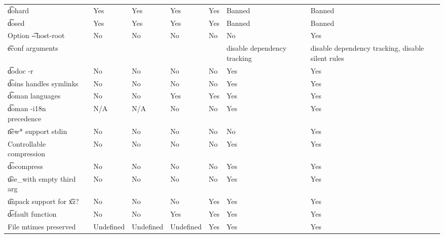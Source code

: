 \begin{landscape}
\begin{longtable}{llP{5em}P{5em}P{6em}P{6em}P{6em}P{6em}}
\t{dohard} &  &
    Yes & Yes & Yes & Yes & Banned & Banned \\

\t{dosed} &  &
    Yes & Yes & Yes & Yes & Banned & Banned \\

Option \t{-{}-host-root} &  &
    No & No & No & No & No & Yes \\

\t{econf} arguments &  &
    &  &  &  & disable dependency tracking & disable dependency tracking, disable silent rules \\

\t{dodoc -r} &  &
    No & No & No & No & Yes & Yes \\

\t{doins} handles symlinks &  &
    No & No & No & No & Yes & Yes \\

\t{doman} languages &  &
    No & No & Yes & Yes & Yes & Yes \\

\t{doman -i18n} precedence &  &
    N/A & N/A & No & No & Yes & Yes \\

\t{new*} support stdin &  &
    No & No & No & No & No & Yes \\

Controllable compression &  &
    No & No & No & No & Yes & Yes \\

\t{docompress} &  &
    No & No & No & No & Yes & Yes \\

\t{use\_with} empty third arg &  &
    No & No & No & No & Yes & Yes \\

\t{unpack} support for \t{xz}? &  &
    No & No & No & Yes & Yes & Yes \\

\t{default} function &  &
    No & No & Yes & Yes & Yes & Yes \\

File mtimes preserved &  &
    Undefined & Undefined & Undefined & Yes & Yes & Yes \\

\end{longtable}
\end{landscape}

